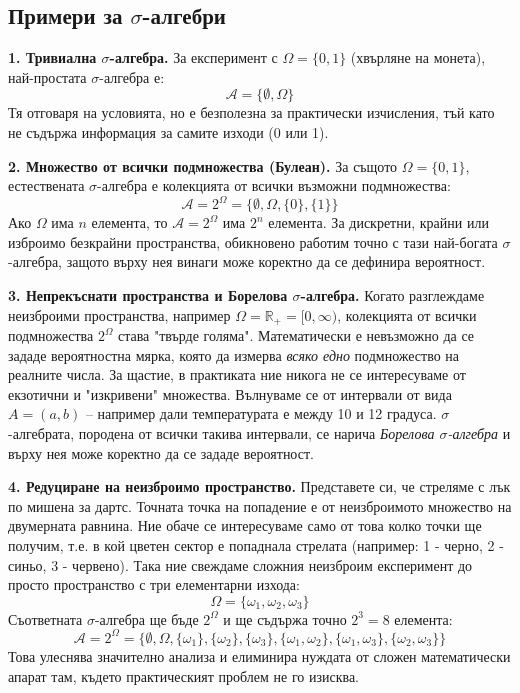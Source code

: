 \documentclass{article}
\begin{document}
\subsection{Примери за $\sigma$-алгебри}

\textbf{1. Тривиална $\sigma$-алгебра.} 
За експеримент с $\Omega = \{0, 1\}$ (хвърляне на монета), най-простата $\sigma$-алгебра е:
\[
\mathcal{A} = \{\emptyset, \Omega\}
\]
Тя отговаря на условията, но е безполезна за практически изчисления, тъй като не съдържа информация за самите изходи (0 или 1).

\textbf{2. Множество от всички подмножества (Булеан).} 
За същото $\Omega = \{0, 1\}$, естествената $\sigma$-алгебра е колекцията от всички възможни подмножества:
\[
\mathcal{A} = 2^\Omega = \{\emptyset, \Omega, \{0\}, \{1\}\}
\]
Ако $\Omega$ има $n$ елемента, то $\mathcal{A} = 2^\Omega$ има $2^n$ елемента. За дискретни, крайни или изброимо безкрайни пространства, обикновено работим точно с тази най-богата $\sigma$-алгебра, защото върху нея винаги може коректно да се дефинира вероятност.

\textbf{3. Непрекъснати пространства и Борелова $\sigma$-алгебра.}
Когато разглеждаме неизброими пространства, например $\Omega = \mathbb{R}_+ = [0, \infty)$, колекцията от всички подмножества $2^\Omega$ става "твърде голяма". Математически е невъзможно да се зададе вероятностна мярка, която да измерва \emph{всяко едно} подмножество на реалните числа. За щастие, в практиката ние никога не се интересуваме от екзотични и "изкривени" множества. Вълнуваме се от интервали от вида $A = (a, b)$ – например дали температурата е между 10 и 12 градуса. $\sigma$-алгебрата, породена от всички такива интервали, се нарича \emph{Борелова $\sigma$-алгебра} и върху нея може коректно да се зададе вероятност.

\textbf{4. Редуциране на неизброимо пространство.}
Представете си, че стреляме с лък по мишена за дартс. Точната точка на попадение е от неизброимото множество на двумерната равнина. Ние обаче се интересуваме само от това колко точки ще получим, т.е. в кой цветен сектор е попаднала стрелата (например: 1 - черно, 2 - синьо, 3 - червено). Така ние свеждаме сложния неизброим експеримент до просто пространство с три елементарни изхода:
\[
\Omega = \{\omega_1, \omega_2, \omega_3\}
\]
Съответната $\sigma$-алгебра ще бъде $2^\Omega$ и ще съдържа точно $2^3 = 8$ елемента:
\[
\mathcal{A} = 2^\Omega = \{\emptyset, \Omega, \{\omega_1\}, \{\omega_2\}, \{\omega_3\}, \{\omega_1, \omega_2\}, \{\omega_1, \omega_3\}, \{\omega_2, \omega_3\}\}
\]
Това улеснява значително анализа и елиминира нуждата от сложен математически апарат там, където практическият проблем не го изисква.
\end{document}
